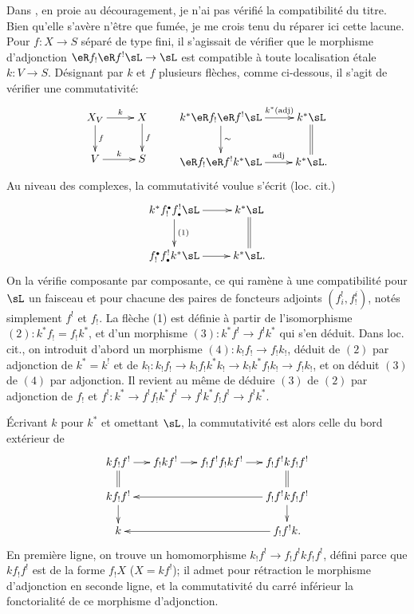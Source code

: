 Dans \cite[XVIII]{sga4}, en proie au découragement, je n'ai pas vérifié 
la compatibilité du titre. Bien qu'elle s'avère n'être que fumée, je me 
crois tenu du réparer ici cette lacune. Pour $f:X\to S$ séparé de type 
fini, il s'agissait de vérifier que le morphisme d'adjonction 
$\eR f_!\eR f^!\sL\to \sL$ est compatible à toute localisation étale 
$k:V\to S$. Désignant par $k$ et $f$ plusieurs flèches, comme ci-dessous, 
il s'agit de vérifier une commutativité:
\[\xymatrix{
  X_V \ar[r]^-k \ar[d]^-f 
    & X \ar[d]^-f \\
  V \ar[r]^-k 
    & S 
} \qquad 
\xymatrix{
  k^\ast \eR f_! \eR f^!\sL \ar[r]^-{k^\ast(\text{adj})} \ar[d]^-\sim 
    & k^\ast \sL \ar@{=}[d] \\
  \eR f_! \eR f^! k^\ast \sL \ar[r]^-{\text{adj}} 
    & k^\ast \sL \text{.}
}\]
Au niveau des complexes, la commutativité voulue s'écrit (loc. cit.) 
\[\xymatrix{
  k^\ast f_!^\bullet f^!_\bullet \sL \ar[r] \ar[d]^-{(1)} 
    & k^\ast \sL \ar@{=}[d] \\
  f_!^\bullet f^!_\bullet k^\ast \sL \ar[r] 
    & k^\ast \sL \text{.}
}\]
On la vérifie composante par composante, ce qui ramène à une 
compatibilité pour $\sL$ un faisceau et pour chacune des paires de foncteurs 
adjoints $(f_i^!,f_!^i)$, notés simplement $f^!$ et $f_!$. La flèche (1) 
est définie à partir de l'isomorphisme $(2):k^\ast f_!=f_! k^\ast$, et d'un 
morphisme $(3):k^\ast f^! \to f^! k^\ast$ qui s'en déduit. Dans loc. cit., on 
introduit d'abord un morphisme $(4):k_! f_!\to f_! k_!$, déduit de $(2)$ par 
adjonction de $k^\ast=k^!$ et de 
$k_!:k_! f_!\to k_! f_! k^\ast k_!\to k_! k^\ast f_! k_! \to f_! k_!$, et on 
déduit $(3)$ de $(4)$ par adjonction. Il revient au même de déduire $(3)$ 
de $(2)$ par adjonction de $f_!$ et 
$f^!:k^\ast \to f^! f_! k^\ast f^!\to f^! k^\ast f_! f^! \to f^! k^\ast$. 

Écrivant $k$ pour $k^\ast$ et omettant $\sL$, la commutativité est alors 
celle du bord extérieur de 
\[\xymatrix@=.5cm{
  k f_! f^! \ar[r] \ar@{=}[d]
    & f_! k f^! \ar[r] 
    & f_! f^! f_! k f^! \ar[r] 
    & f_! f^! k f_! f^! \ar@{=}[d] \\
  k f_! f^! \ar[d] 
    & & & \ar[lll] f_! f^! k f_! f^! \ar[d] \\
  k 
    & & & \ar[lll] f_! f^! k \text{.}
}\]
En première ligne, on trouve un homomorphisme 
$k _! f^! \to f_! f^! k f_! f^!$, défini parce que $k f_! f^!$ est de la 
forme $f_! X$ ($X=k f^!$); il admet pour rétraction le morphisme 
d'adjonction en seconde ligne, et la commutativité du carré inférieur la 
fonctorialité de ce morphisme d'adjonction. 




